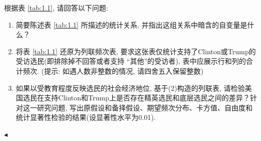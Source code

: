 \documentclass[11pt]{article}
\newenvironment{problem}[2][Problem]{\begin{trivlist}
\item[\hskip \labelsep {\bfseries #1}\hskip \labelsep {\bfseries #2.}]\songti}{\hfill$\blacktriangleleft$\end{trivlist}}
\newcommand\1{\mathds{1}}
\begin{document}
\begin{problem}{1}
    根据表 \ref{tab:1.1}, 请回答以下问题:
    \begin{enumerate}[label=(\arabic*)]
        \item 简要陈述表 \ref{tab:1.1} 所描述的统计关系, 并指出这组关系中暗含的自变量是什么？
        \item 将表 \ref{tab:1.1} 还原为列联频次表, 要求这张表仅统计支持了Clinton或Trump的受访选民(即排除掉不回答或者支持 “其他”的受访者), 表中应展示行和列的合计频次.  {\kaishu (提示: 如遇人数非整数的情况, 请四舍五入保留整数)}
        \item 如果以受教育程度反映选民的社会经济地位, 基于(2)构造的列联表, 请检验美国选民在支持Clinton和Trump上是否存在精英选民和底层选民之间的差异？针对这一研究问题, 写出原假设和备择假设、期望频次分布、卡方值、自由度和统计显著性检验的结果(设显著性水平为0.01). 
    \end{enumerate}
\end{problem}
\end{document}
